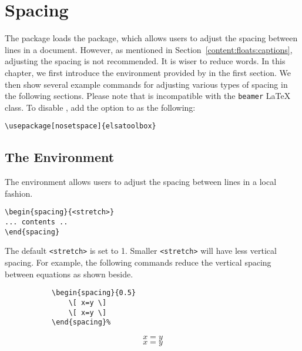 \chapter{Spacing}
\label{content:spacing}

The \elsatoolbox{} package loads the  package, which allows users to adjust the spacing between lines in a document. However, as mentioned in Section~\ref{content:floats:captions}, adjusting the spacing is not recommended. It is wiser to reduce words. In this chapter, we first introduce the  environment provided by  in the first section. We then show several example commands for adjusting various types of spacing in the following sections. Please note that  is incompatible with the \texttt{beamer} \LaTeX{} class. To disable , add the option  to \elsatoolbox{} as the following:

\begin{center}
    \verb|\usepackage[nosetspace]{elsatoolbox}|
\end{center}

\section{The  Environment}

The  environment allows users to adjust the spacing between lines in a local fashion.

\bigskip

\begin{lstlisting}
\begin{spacing}{<stretch>}
... contents ..
\end{spacing}
\end{lstlisting}

The default \verb|<stretch>| is set to 1. Smaller \verb|<stretch>| will have less vertical spacing. For example, the following commands reduce the vertical spacing between equations as shown beside.

\begin{figure}[h]
    \centering
    \begin{subfigure}{.35\linewidth}
\begin{lstlisting}
\begin{spacing}{0.5}
    \[ x=y \]
    \[ x=y \]
\end{spacing}%
\end{lstlisting}
    \end{subfigure}%
    \begin{subfigure}{.3\linewidth}
        \begin{spacing}{0.5}
            \[ x=y \]
            \[ x=y \]
        \end{spacing}
    \end{subfigure}
\end{figure}

